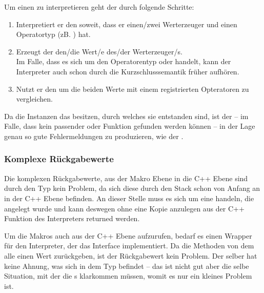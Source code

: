       Um einen  zu interpretieren geht der  durch folgende Schritte:
      \begin{enumerate}
        \item Interpretiert er den   soweit, dass er einen/zwei Werterzeuger und einen Operatortyp (zB. \myMinin{==}) hat.
        \item Erzeugt der  den/die Wert/e des/der Werterzeuger/s.\\
          Im Falle, dass es sich um den Operatorentyp \myMinin{&&} oder \myMinin{||} handelt, kann der Interpreter auch schon durch die Kurzschlusssemantik früher aufhören.
        \item Nutzt er den  um die beiden Werte mit einem registrierten Opteratoren zu vergleichen.
      \end{enumerate}

      Da die  Instanzen das  besitzen, durch welches sie entstanden sind, ist der  -- im Falle, dass kein passender  oder Funktion gefunden werden können -- in der Lage genau so gute Fehlermeldungen zu produzieren, wie der .

    \subsubsection{Komplexe Rückgabewerte}
    \label{sssec:Komplexe Rückgabewerte}
      Die komplexen Rückgabewerte, aus der Makro Ebene in die C++ Ebene sind durch den  Typ kein Problem, da sich diese durch den Stack schon von Anfang an in der C++ Ebene befinden. An dieser Stelle muss es sich um eine  handeln, die angelegt wurde und kann deswegen ohne eine Kopie anzulegen aus der C++ Funktion des Interpreters returned werden.

      Um die Makros auch aus der C++ Ebene aufzurufen, bedarf es einen Wrapper für den Interpreter, der das  Interface implementiert. Da die  Methoden von dem  alle einen  Wert zurückgeben, ist der Rückgabewert kein Problem. Der  selber hat keine Ahnung, was sich in dem  Typ befindet -- das ist nicht gut aber die selbe Situation, mit der die s klarkommen müssen, womit es nur ein kleines Problem ist.

